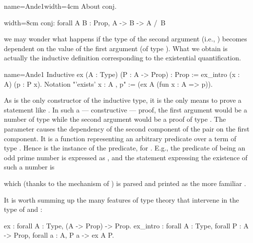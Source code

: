 \begin{coq-left}{name=Ande1}{width=4cm}
About conj.
\end{coq-left}
\begin{coqout-right}{}{width=8cm}
conj: forall A B : Prop, A -> B -> A /\ B
\end{coqout-right}

we may wonder what happens if the type of the second argument (i.e., )
becomes dependent on the value of the first argument (of type ).
What we obtain is actually the inductive definition corresponding to the
existential quantification.

\begin{coq}{name=Ande1}{}
Inductive ex (A : Type) (P : A -> Prop) : Prop :=
  ex_intro (x : A) (p : P x).
Notation "'exists' x : A , p" := (ex A (fun x : A => p)).
\end{coq}

As   is the only constructor of the  inductive
type, it is the only means to prove a statement like
.  In such a --- constructive --- proof, the first
argument would be a number
 of type  while the second argument would be a proof  of type
.  The parameter  causes the dependency of the
second component of the pair on the first component. It is a function
representing an arbitrary predicate over a term of
type .  Hence  is the instance of the predicate, for .  E.g.,
the predicate of being an odd prime number is expressed as
, and the statement expressing the
existence of such a number is

\centerline{} 
which (thanks to the  mechanism of \Coq{}) is parsed and
printed as the more familiar .

It is worth summing up the many features of type theory that
intervene in the type of  and :

\begin{coq}{}{}
ex : forall A : Type, (A -> Prop) -> Prop.
ex_intro : forall A : Type, forall P : A -> Prop, forall a : A, P a -> ex A P.
\end{coq}

